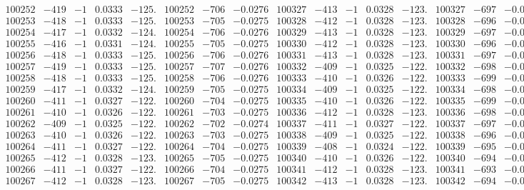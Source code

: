 \documentclass[11pt,reqno,a4letter]{article}
\numberwithin{figure}{section}
\numberwithin{table}{section}
\theoremstyle{plain}
\numberwithin{theorem}{section}
\theoremstyle{definition}
\begin{document}
\begin{table}[ht!]
\begin{equation*}
{\begin{array}{ccccc|ccc||ccccc|ccc}
100252 & -419 & -1 & 0.0333 & -125. & 100252 & -706 & -0.0276 & 100327 & -413 & -1 & 0.0328 & -123. & 100327 & -697 & -0.0272  \\
100253 & -418 & -1 & 0.0333 & -125. & 100253 & -705 & -0.0275 & 100328 & -412 & -1 & 0.0328 & -123. & 100328 & -696 & -0.0272  \\
100254 & -417 & -1 & 0.0332 & -124. & 100254 & -706 & -0.0276 & 100329 & -413 & -1 & 0.0328 & -123. & 100329 & -697 & -0.0272  \\
100255 & -416 & -1 & 0.0331 & -124. & 100255 & -705 & -0.0275 & 100330 & -412 & -1 & 0.0328 & -123. & 100330 & -696 & -0.0272  \\
100256 & -418 & -1 & 0.0333 & -125. & 100256 & -706 & -0.0276 & 100331 & -413 & -1 & 0.0328 & -123. & 100331 & -697 & -0.0272  \\
100257 & -419 & -1 & 0.0333 & -125. & 100257 & -707 & -0.0276 & 100332 & -409 & -1 & 0.0325 & -122. & 100332 & -698 & -0.0273  \\
100258 & -418 & -1 & 0.0333 & -125. & 100258 & -706 & -0.0276 & 100333 & -410 & -1 & 0.0326 & -122. & 100333 & -699 & -0.0273  \\
100259 & -417 & -1 & 0.0332 & -124. & 100259 & -705 & -0.0275 & 100334 & -409 & -1 & 0.0325 & -122. & 100334 & -698 & -0.0273  \\
100260 & -411 & -1 & 0.0327 & -122. & 100260 & -704 & -0.0275 & 100335 & -410 & -1 & 0.0326 & -122. & 100335 & -699 & -0.0273  \\
100261 & -410 & -1 & 0.0326 & -122. & 100261 & -703 & -0.0275 & 100336 & -412 & -1 & 0.0328 & -123. & 100336 & -698 & -0.0273  \\
100262 & -409 & -1 & 0.0325 & -122. & 100262 & -702 & -0.0274 & 100337 & -411 & -1 & 0.0327 & -122. & 100337 & -697 & -0.0272  \\
100263 & -410 & -1 & 0.0326 & -122. & 100263 & -703 & -0.0275 & 100338 & -409 & -1 & 0.0325 & -122. & 100338 & -696 & -0.0272  \\
100264 & -411 & -1 & 0.0327 & -122. & 100264 & -704 & -0.0275 & 100339 & -408 & -1 & 0.0324 & -122. & 100339 & -695 & -0.0271  \\
100265 & -412 & -1 & 0.0328 & -123. & 100265 & -705 & -0.0275 & 100340 & -410 & -1 & 0.0326 & -122. & 100340 & -694 & -0.0271  \\
100266 & -411 & -1 & 0.0327 & -122. & 100266 & -704 & -0.0275 & 100341 & -412 & -1 & 0.0328 & -123. & 100341 & -693 & -0.0271  \\
100267 & -412 & -1 & 0.0328 & -123. & 100267 & -705 & -0.0275 & 100342 & -413 & -1 & 0.0328 & -123. & 100342 & -694 & -0.0271  \\

\end{array}}
\end{equation*}
\end{table}
\end{document}
